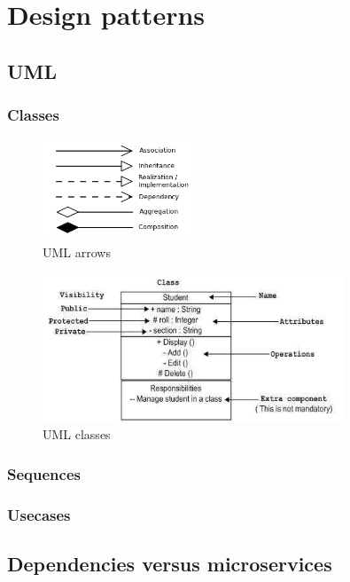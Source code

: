 \section{Design patterns}

\subsection{UML}

\subsubsection{Classes}

\begin{figure}[h]
\caption{UML arrows}
\centering
\includegraphics[width=0.4\textwidth]{images/umlArrows.png}
\end{figure}


\begin{figure}[h]
\caption{UML classes}
\centering
\includegraphics[width=0.8\textwidth]{images/umlClass.jpg}
\end{figure}

\subsubsection{Sequences}

\subsubsection{Usecases}

\subsection{Dependencies versus microservices}

